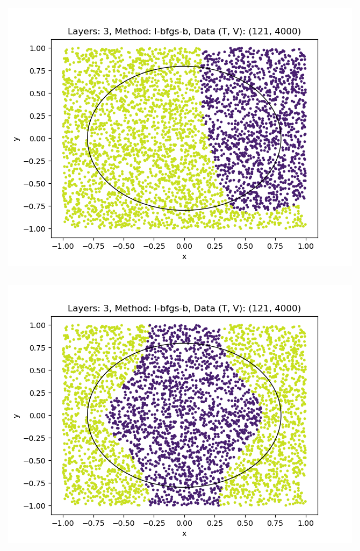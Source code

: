 \begin{figure}[h]
\begin{subfigure}[b]{0.45\textwidth}
        \includegraphics[width=\textwidth]{sections/chapters/Quantum-Machine-Learning/Images/Data-Re-Uploading/Layer3-B.png}
    \end{subfigure}
    \begin{subfigure}[b]{0.45\textwidth}
        \centering
        \includegraphics[width=\textwidth]{sections/chapters/Quantum-Machine-Learning/Images/Data-Re-Uploading/Layer3-A.png}
    \end{subfigure}
    \begin{subfigure}[b]{0.45\textwidth}
        \centering

\end{subfigure}
\end{figure}

